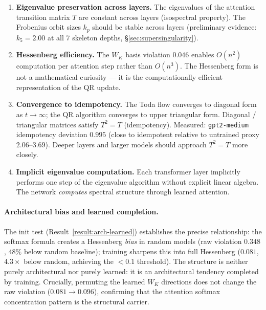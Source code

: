 \documentclass[11pt]{amsart}
\theoremstyle{definition}
\begin{document}
\begin{enumerate}
\item \textbf{Eigenvalue preservation across layers.}
  The eigenvalues of the attention transition matrix $T$ are constant
  across layers (isospectral property).
  The Frobenius orbit sizes $k_p$ should be stable across layers
  (preliminary evidence: $k_5 = 2.00$ at all 7 skeleton depths, §\ref{sec:supersingularity}).

\item \textbf{Hessenberg efficiency.}
  The $W_K$ basis violation $0.046$ enables $O(n^2)$ computation per
  attention step rather than $O(n^3)$.
  The Hessenberg form is not a mathematical curiosity ---
  it is the computationally efficient representation of the QR update.

\item \textbf{Convergence to idempotency.}
  The Toda flow converges to diagonal form as $t\to\infty$;
  the QR algorithm converges to upper triangular form.
  Diagonal / triangular matrices satisfy $T^2 = T$ (idempotency).
  Measured: \texttt{gpt2-medium} idempotency deviation $0.995$
  (close to idempotent relative to untrained proxy $2.06$--$3.69$).
  Deeper layers and larger models should approach $T^2=T$ more closely.

\item \textbf{Implicit eigenvalue computation.}
  Each transformer layer implicitly performs one step of the
  eigenvalue algorithm without explicit linear algebra.
  The network \emph{computes} spectral structure through learned attention.
\end{enumerate}

\paragraph{Architectural bias and learned completion.}
The init test (Result~\ref{result:arch-learned}) establishes the precise
relationship: the softmax formula creates a Hessenberg \emph{bias}
in random models (raw violation $0.348$, $48\%$ below random baseline);
training sharpens this into full Hessenberg ($0.081$, $4.3\times$ below
random, achieving the $<0.1$ threshold).
The structure is neither purely architectural nor purely learned:
it is an architectural tendency completed by training.
Crucially, permuting the learned $W_K$ directions does not change the
raw violation ($0.081 \to 0.096$), confirming that the attention
softmax concentration pattern is the structural carrier.
\end{document}
